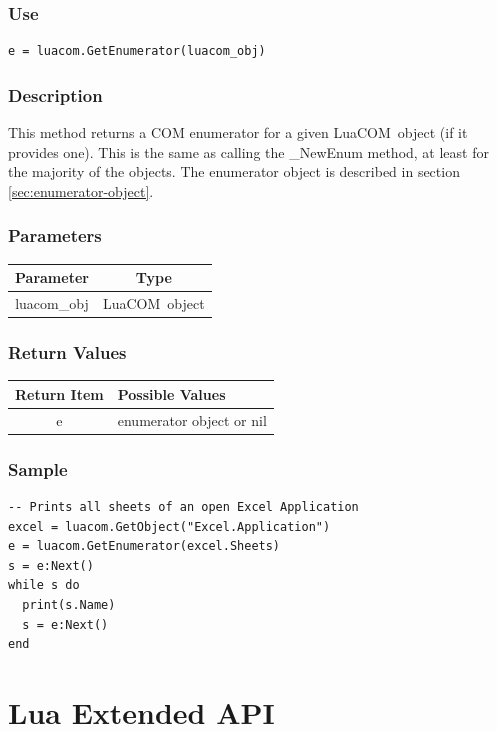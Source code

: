 \documentclass[11pt,a4paper,english]{report}
\newcommand{\ttext}[1]{#1}
\newcommand{\ttext}[1]{{\raggedright #1 \\}}
\newcommand{\techname}[1]{\mbox{#1}}
\newcommand{\luacom}{\techname{LuaCOM}}
\begin{document}
\subsubsection*{Use}

\begin{verbatim}
e = luacom.GetEnumerator(luacom_obj)
\end{verbatim}

\subsubsection*{Description}
This method returns a COM enumerator for a given \luacom\ object (if
it provides one). This is the same as calling the \ttext{\_NewEnum}
method, at least for the majority of the objects. The enumerator
object is described in section \ref{sec:enumerator-object}.

\subsubsection*{Parameters}
\begin{tabular}{|c|c|}
\hline
\bf Parameter & \bf Type  \\ \hline \hline
luacom\_obj & \luacom\ object  \\ \hline
\end{tabular}

\subsubsection*{Return Values}

\begin{tabular}{|c|p{4cm}|}
\hline
\bf Return Item & \bf Possible Values \\ \hline \hline
e  & enumerator object or nil \\ \hline
\end{tabular}


\subsubsection*{Sample}

\begin{verbatim}
-- Prints all sheets of an open Excel Application
excel = luacom.GetObject("Excel.Application")
e = luacom.GetEnumerator(excel.Sheets)
s = e:Next()
while s do
  print(s.Name)
  s = e:Next()
end
\end{verbatim}

\section{Lua Extended API}
\end{document}
